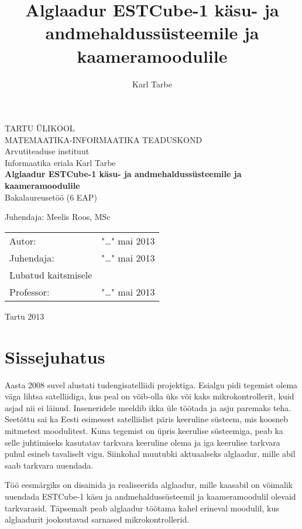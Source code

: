 \documentclass[12pt,a4paper]{article}
\title{Alglaadur ESTCube-1 käsu- ja andmehaldussüsteemile ja kaameramoodulile}
\author{Karl Tarbe}
\begin{document}
\begin{titlepage}
\begin{center}
	{\large TARTU ÜLIKOOL\\
MATEMAATIKA-INFORMAATIKA TEADUSKOND\\
Arvutiteaduse instituut\\
Informaatika eriala}
\vskip4cm
{\large Karl Tarbe}\\[6mm]
{\huge\bf Alglaadur ESTCube-1 käsu- ja andmehaldussüsteemile ja kaameramoodulile}\\[4mm]
{\large Bakalaureusetöö (6 EAP)}
\end{center}
\vspace{2cm}
\begin{flushright}
	\large
	Juhendaja: Meelis Roos, MSc
\end{flushright}
\vspace{2cm}
\begin{tabular}{l p{8cm} r}
	Autor: & \dotfill & "\dots" mai 2013\\
	Juhendaja: & \dotfill & "\dots" mai 2013\\[6mm]
	\multicolumn{2}{l}{Lubatud kaitsmisele}\\
	Professor: & \dotfill & "\dots" mai 2013\\
\end{tabular}
\vfill
\centerline{Tartu 2013}
\end{titlepage}
\setcounter{page}{2}
\tableofcontents

\printglossaries
\newpage

\section{Sissejuhatus}
Aasta 2008 suvel alustati tudengisatelliidi projektiga. Esialgu pidi tegemist
olema väga lihtsa satelliidiga, kus peal on võib-olla üks või kaks
mikrokontrollerit, kuid asjad nii ei läinud. Inseneridele meeldib ikka üle
töötada ja asju paremaks teha. Seetõttu sai ka Eesti esimesest satelliidist päris
keeruline süsteem, mis koosneb mitmetest moodulitest. Kuna tegemist on üpris
keerulise süsteemiga, peab ka selle juhtimiseks kasutatav tarkvara keeruline
olema ja iga keerulise tarkvara puhul esineb tavaliselt vigu. Siinkohal muutubki
aktuaalseks alglaadur, mille abil saab tarkvara uuendada.

Töö eesmärgiks on disainida ja realiseerida alglaadur, mille kaasabil on
võimalik uuendada ESTCube-1 käsu ja andmehaldussüsteemil ja kaameramoodulil
olevaid tarkvarasid. Täpsemalt peab alglaadur töötama kahel erineval moodulil,
kus alglaadurit jooksutavad sarnased mikrokontrollerid.
\end{document}

